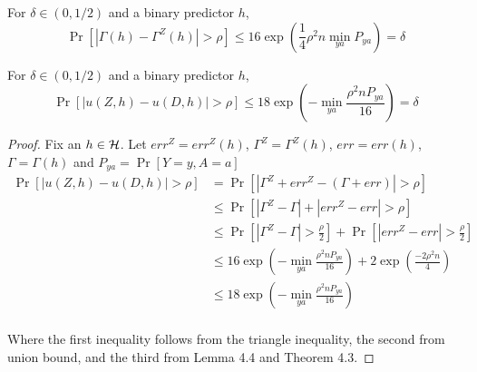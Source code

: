\begin{lemma} For $\delta \in (0,1/2)$ and a binary predictor $h$,
	$$\Pr[|\Gamma(h) - \Gamma^Z(h)|>\rho ] \leq 16 \exp(\frac{1}{4}\rho^2n
	\min_{ya}{P_{ya}}) = \delta$$
\end{lemma}

\begin{lemma}
	For $\delta \in (0,1/2)$ and a binary predictor $h$,
	$$\Pr[|u(Z,h) - u(D,h)| > \rho] \leq 18\exp(-\min_{ya}{\frac{\rho^2 n
	P_{ya}}{16}}) = \delta$$
\end{lemma}
\begin{proof}
	Fix an $h \in \mathcal{H}$. Let $err^Z = err^Z(h)$, $\Gamma^Z = \Gamma^Z(h)$, $err = err(h)$, $\Gamma = \Gamma(h)$ and $P_{ya} = \Pr[Y=y, A=a]$
	\begin{align*}
	\Pr[|u(Z,h) - u(D,h)| > \rho] & = \Pr[|\Gamma^Z + err^Z - (\Gamma +err) | > \rho]\\
	&\leq \Pr[|\Gamma^Z - \Gamma|  + |err^Z - err| > \rho]\\
	&\leq \Pr[|\Gamma^Z - \Gamma|> \frac{\rho}{2}]  + \Pr[|err^Z - err| > \frac{\rho}{2}]\\
	&\leq 16\exp(-\min_{ya}{\frac{\rho^2 n P_{ya}}{16}}) + 2\exp(\frac{-2\rho^2n}{4})\\
	&\leq 18\exp(-\min_{ya}{\frac{\rho^2 n P_{ya}}{16}})\\
	\end{align*}

	Where the first inequality follows from the triangle inequality, the second from union bound, and the third from Lemma 4.4 and Theorem 4.3.
\end{proof}


